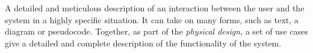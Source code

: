 \begin{tool} \label{tool:use_case} 
  A detailed and meticulous description of an interaction between the user and the system in a highly specific situation. It can take on many forms, such as text, a diagram or pseudocode. Together, as part of the \emph{physical design}, a set of use cases give a detailed and complete description of the functionality of the system. \cite[p. 65]{benyon14}
\end{tool}
